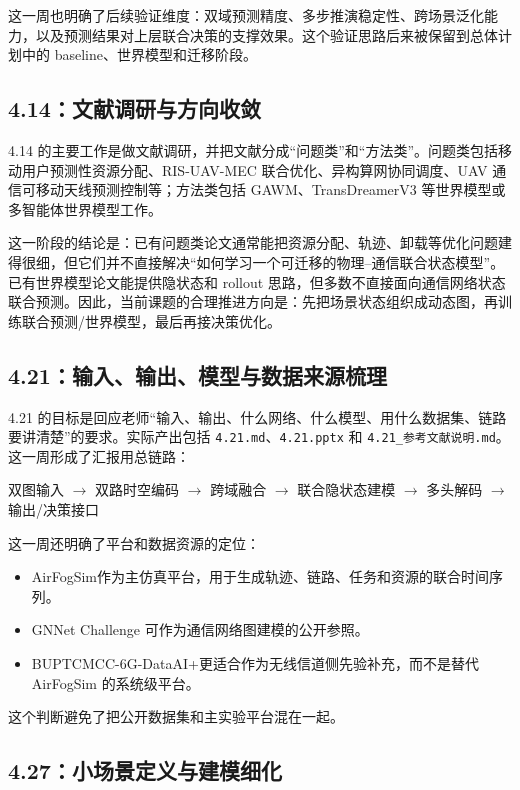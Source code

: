 ﻿\documentclass[UTF8,a4paper,11pt]{ctexart}
\newcommand{\code}[1]{\texttt{#1}}
\begin{document}
这一周也明确了后续验证维度：双域预测精度、多步推演稳定性、跨场景泛化能力，以及预测结果对上层联合决策的支撑效果。这个验证思路后来被保留到总体计划中的 baseline、世界模型和迁移阶段。

\subsection{4.14：文献调研与方向收敛}

4.14 的主要工作是做文献调研，并把文献分成“问题类”和“方法类”。问题类包括移动用户预测性资源分配、RIS-UAV-MEC 联合优化、异构算网协同调度、UAV 通信可移动天线预测控制等；方法类包括 GAWM、TransDreamerV3 等世界模型或多智能体世界模型工作。

这一阶段的结论是：已有问题类论文通常能把资源分配、轨迹、卸载等优化问题建得很细，但它们并不直接解决“如何学习一个可迁移的物理--通信联合状态模型”。已有世界模型论文能提供隐状态和 rollout 思路，但多数不直接面向通信网络状态联合预测。因此，当前课题的合理推进方向是：先把场景状态组织成动态图，再训练联合预测/世界模型，最后再接决策优化。

\subsection{4.21：输入、输出、模型与数据来源梳理}

4.21 的目标是回应老师“输入、输出、什么网络、什么模型、用什么数据集、链路要讲清楚”的要求。实际产出包括 \code{4.21.md}、\code{4.21.pptx} 和 \code{4.21\_参考文献说明.md}。这一周形成了汇报用总链路：

\begin{center}
双图输入 $\rightarrow$ 双路时空编码 $\rightarrow$ 跨域融合 $\rightarrow$ 联合隐状态建模 $\rightarrow$ 多头解码 $\rightarrow$ 输出/决策接口
\end{center}

这一周还明确了平台和数据资源的定位：

\begin{itemize}
  \item AirFogSim\cite{wei2024airfogsim}作为主仿真平台，用于生成轨迹、链路、任务和资源的联合时间序列。
  \item GNNet Challenge 可作为通信网络图建模的公开参照。
  \item BUPTCMCC-6G-DataAI+\cite{yang2025buptcmcc}更适合作为无线信道侧先验补充，而不是替代 AirFogSim 的系统级平台。
\end{itemize}

这个判断避免了把公开数据集和主实验平台混在一起。

\subsection{4.27：小场景定义与建模细化}
\end{document}

